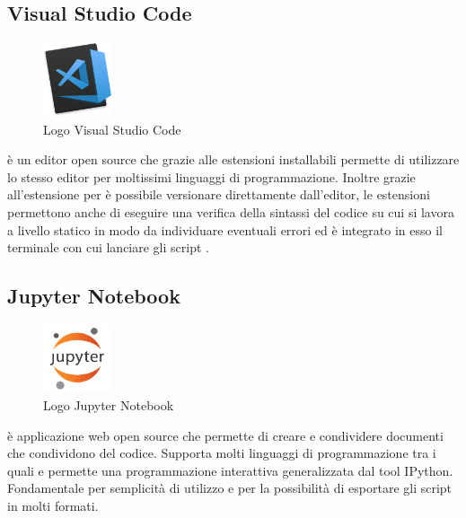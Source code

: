 \subsection{Visual Studio Code}
\begin{figure}[H]
	\begin{center} \includegraphics[width=2cm]{figures/Visual_Studio_code}
		\caption[Logo Visual Studio Code]{Logo Visual Studio Code}
	\end{center}
\end{figure}
 è un editor open source che grazie alle estensioni installabili permette di utilizzare lo stesso editor per moltissimi linguaggi di programmazione. Inoltre grazie all'estensione per  è possibile versionare direttamente dall'editor, le estensioni permettono anche di eseguire una verifica della sintassi del codice su cui si lavora a livello statico in modo da individuare eventuali errori ed è integrato in esso il terminale con cui lanciare gli script .

\subsection{Jupyter Notebook}
\begin{figure}[H]
	\begin{center} \includegraphics[width=2cm]{figures/jupyter}
		\caption[Logo Jupyter Notebook]{Logo Jupyter Notebook}
	\end{center}
\end{figure}
 è applicazione web open source che permette di creare e condividere documenti che condividono del codice. Supporta molti linguaggi di programmazione tra i quali  e permette una programmazione interattiva generalizzata dal tool IPython. Fondamentale per semplicità di utilizzo e per la possibilità di esportare gli script in molti formati.

